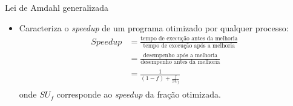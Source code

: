 \begin{slide}{Lei de Amdahl generalizada}
\begin{itemize}
   \item Caracteriza o \textit{speedup} de um programa otimizado por qualquer processo:
   \begin{align*}
      Speedup &= \frac{\text{tempo de execução antes da melhoria}}{\text{tempo de execução após a melhoria}}\\
              &= \frac{\text{desempenho após a melhoria}}{\text{desempenho antes da melhoria}}\\
              &= \frac{1}{(1-f)+\frac{f}{SU_f}}\\
   \end{align*}
   onde $SU_f$ corresponde ao \textit{speedup} da fração otimizada.
\end{itemize}
\end{slide}


